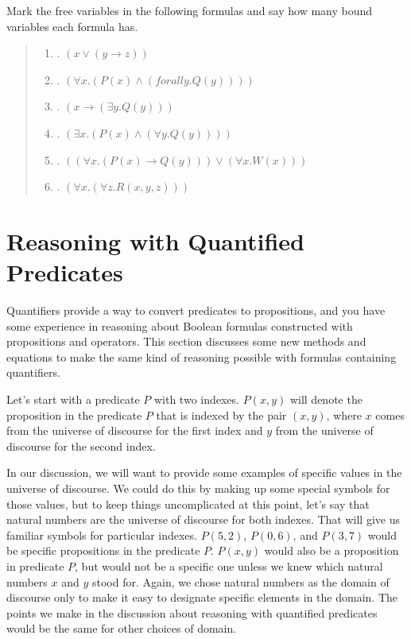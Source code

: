 {\begin{ExerciseList}
\Exercise
Mark the
free variables in the following formulas and say how many bound variables
each formula has.
\begin{quote}
\begin{enumerate}[label=\alph*]
\item. $(x \vee (y \rightarrow z))$
\item. $(\forall x.(P(x) \wedge (forall y.Q(y))))$
\item. $(x \rightarrow (\exists y.Q(y)))$
\item. $(\exists x.(P(x) \wedge (\forall y.Q(y))))$
\item. $((\forall x.(P(x) \rightarrow Q(y))) \vee (\forall x.W(x)))$
\item. $(\forall x. (\forall z.R(x, y, z)))$
\end{enumerate}
\end{quote}

\end{ExerciseList}

\section{Reasoning with Quantified Predicates}
\label{sec:quantifier-equations}

Quantifiers provide a way to convert predicates to propositions,
and you have some experience in reasoning about Boolean formulas constructed with
propositions and operators.
This section discusses some new methods and equations to make
the same kind of reasoning possible with formulas containing quantifiers.

Let's start with a predicate $P$ with two indexes.
$P(x,y)$ will denote the proposition in the predicate $P$ that is indexed
by the pair $(x,y)$, where $x$ comes from the universe of discourse for the first index
and $y$ from the universe of discourse for the second index.

In our discussion, we will want to provide some examples
of specific values in the universe of discourse.
We could do this by making up some special symbols for those values,
but to keep things uncomplicated at this point,
let's say that natural numbers are the universe of discourse for both indexes.
That will give us familiar symbols for particular indexes.
$P(5,2)$, $P(0,6)$, and $P(3,7)$ would be specific propositions in the predicate $P$.
$P(x,y)$ would also be a proposition in predicate $P$, but would not be a specific one
unless we knew which natural numbers $x$ and $y$ stood for.
Again, we chose natural numbers as the domain of discourse
only to make it easy to designate specific elements in the domain.
The points we make in the discussion about reasoning with quantified predicates
would be the same for other choices of domain.

}
